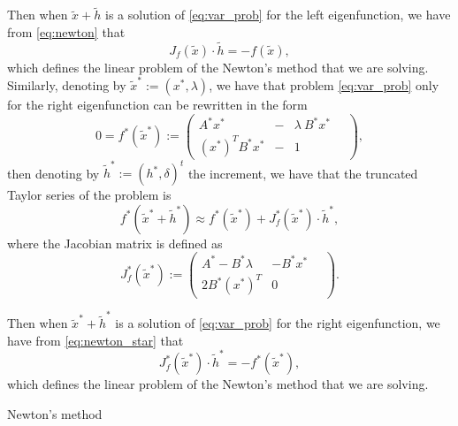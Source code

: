 \documentclass[preprint,12pt]{elsarticle}
\begin{document}
Then when $\tilde x + \tilde h$ is a solution of \eqref{eq:var_prob} for the left eigenfunction, we have from \eqref{eq:newton}
that 
$$
J_f(\tilde x)\cdot \tilde h = - f(\tilde x),
$$
which defines the linear problem of the Newton's method that we are solving.
Similarly, denoting by $\tilde x^*:=(x^*,\lambda)$, we have that problem \eqref{eq:var_prob} only for the right eigenfunction can be rewritten in the form
$$
0=f^*(\tilde x^*):=
\left(
\begin{array}{lcl}
A^* x^*&-& \lambda\ B^*x^*
\\
  (x^*)^T B^*x^*&-& 1
\end{array}\quad
\right) ,
$$
then denoting by $\tilde h^*:=(h^*, \delta)^t$ the increment, we have that the truncated Taylor series of the problem is
\begin{equation}\label{eq:newton_star}
f^*(\tilde x^* + \tilde h^*)\approx f^*(\tilde x^*) + J_f^*(\tilde x^*)\cdot \tilde h^*, 
\end{equation}
where the Jacobian matrix is defined as
$$
J_f^*(\tilde x^*):=
\left(
\begin{array}{lr}
A^* - B^*\lambda & -B^*x^*
\\
  2B^*(x^*)^T  & 0
\end{array}\quad
\right) .
$$

Then when $\tilde x^* + \tilde h^*$ is a solution of \eqref{eq:var_prob} for the right eigenfunction, we have from \eqref{eq:newton_star}
that 
$$
J_f^*(\tilde x^*)\cdot \tilde h^* = - f^*(\tilde x^*),
$$
which defines the linear problem of the Newton's method that we are solving.






\begin{algorithm}[H] \caption{Newton's method} \label{alg:newton} 
\begin{algorithmic}


\REPEAT

\end{algorithmic}
\end{algorithm}
\end{document}
